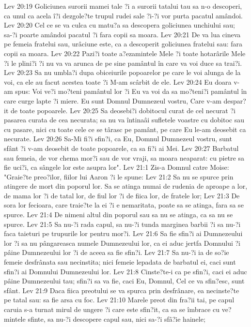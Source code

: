 Lev 20:19  Goliciunea surorii mamei tale ?i a surorii tatalui tau sa n-o descoperi, ca unul ca acela î?i dezgole?te trupul rudei sale ?i-?i vor purta pacatul amândoi.
Lev 20:20  Cel ce se va culca cu matu?a sa descopera goliciunea unchiului sau; sa-?i poarte amândoi pacatul ?i fara copii sa moara.
Lev 20:21  De va lua cineva pe femeia fratelui sau, urâciune este, ca a descoperit goliciunea fratelui sau: fara copii sa moara.
Lev 20:22  Pazi?i toate a?ezamintele Mele ?i toate hotarârile Mele ?i le plini?i ?i nu va va arunca de pe sine pamântul în care va voi duce sa trai?i.
Lev 20:23  Sa nu umbla?i dupa obiceiurile popoarelor pe care le voi alunga de la voi, ca ele au facut acestea toate ?i M-am scârbit de ele.
Lev 20:24  Eu doara v-am spus: Voi ve?i mo?teni pamântul lor ?i Eu va voi da sa mo?teni?i pamântul în care curge lapte ?i miere. Eu sunt Domnul Dumnezeul vostru, Care v-am despar?it de toate popoarele.
Lev 20:25  Sa deosebi?i dobitocul curat de cel necurat ?i pasarea curata de cea necurata; sa nu va întinaâi sufletele voastre cu dobitoc sau cu pasare, nici cu toate cele ce se târasc pe pamânt, pe care Eu le-am deosebit ca necurate.
Lev 20:26  Sa-Mi fi?i sfin?i, ca Eu, Domnul Dumnezeul vostru, sunt sfânt ?i v-am deosebit de toate popoarele, ca sa fi?i ai Mei.
Lev 20:27  Barbatul sau femeia, de vor chema mor?i sau de vor vraji, sa moara neaparat: cu pietre sa fie uci?i, ca sângele lor este asupra lor".
Lev 21:1  Zis-a Domnul catre Moise: "Graie?te preo?ilor, fiilor lui Aaron ?i le spune:
Lev 21:2  Sa nu se spurce prin atingere de mort din poporul lor. Sa se atinga numai de rudenia de aproape a lor, de mama lor ?i de tatal lor, de fiul lor ?i de fiica lor, de fratele lor;
Lev 21:3  De sora lor fecioara, care traie?te la ei ?i e nemaritata, poate sa se atinga, fara sa se spurce.
Lev 21:4  De nimeni altul din poporul sau sa nu se atinga, ca sa nu se spurce.
Lev 21:5  Sa nu-?i rada capul, sa nu-?i tunda marginea barbii ?i sa nu-?i faca taieturi pe trupurile lor pentru mor?i.
Lev 21:6  Sa fie sfin?i ai Dumnezeului lor ?i sa nu pângareasca numele Dumnezeului lor, ca ei aduc jertfa Domnului ?i pâine Dumnezeului lor ?i de aceea sa fie sfin?i.
Lev 21:7  Sa nu-?i ia de so?ie femeie desfrânata sau necinstita; nici femeie lepadata de barbatul ei, caci sunt sfin?i ai Domnului Dumnezeului lor.
Lev 21:8  Cinste?te-i ca pe sfin?i, caci ei aduc pâine Dumnezeului tau; sfin?i sa va fie, caci Eu, Domnul, Cel ce va sfin?esc, sunt sfânt.
Lev 21:9  Daca fiica preotului se va spurca prin desfrânare, ea necinste?te pe tatal sau: sa fie arsa cu foc.
Lev 21:10  Marele preot din fra?ii tai, pe capul caruia s-a turnat mirul de ungere ?i care este sfin?it, ca sa se îmbrace cu ve?mintele sfinte, sa nu-?i descopere capul sau, nici sa-?i sfâ?ie hainele;
